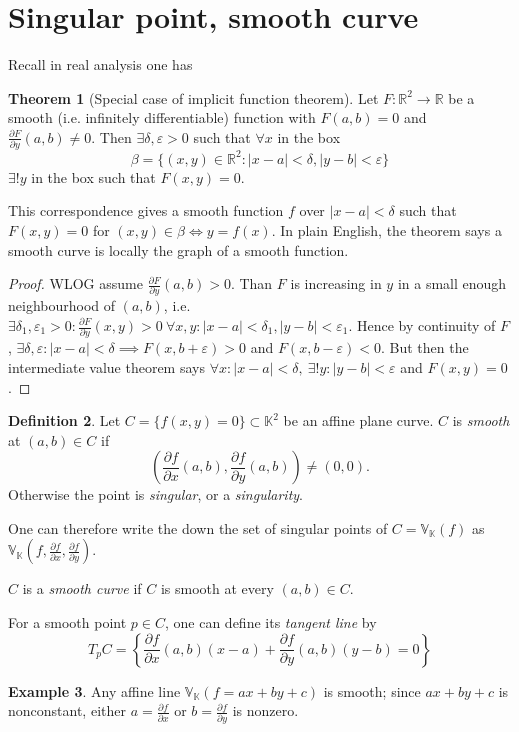 \documentclass{article}
\newcommand{\R}{\mathbb{R}}
\newcommand{\K}{\mathbb{K}}
\newcommand{\V}{\mathbb{V}}
\theoremstyle{definition}
\newtheorem{defn}{Definition}[subsection]
\newtheorem{thm}[defn]{Theorem}
\newtheorem{example}[defn]{Example}
\begin{document}
\section{Singular point, smooth curve}
Recall in real analysis one has
\begin{thm}[Special case of implicit function theorem]
Let $F:\R^2\rightarrow\R$ be a smooth (i.e. infinitely differentiable) function with $F(a,b)=0$ and $\frac{\partial F}{\partial y}(a,b)\neq 0$. Then $\exists \delta,\varepsilon>0$ such that $\forall x$ in the box
\[
\beta=\{(x,y)\in\R^2:|x-a|<\delta,|y-b|<\varepsilon\}
\]
$\exists! y$ in the box such that $F(x,y)=0$.

This correspondence gives a smooth function $f$ over $|x-a|<\delta$ such that $F(x,y)=0$ for $(x,y)\in\beta\iff y=f(x)$. In plain English, the theorem says a smooth curve is locally the graph of a smooth function.
\end{thm}
\begin{proof}
WLOG assume $\frac{\partial F}{\partial y}(a,b)>0$. Than $F$ is increasing in $y$ in a small enough neighbourhood of $(a,b)$, i.e. $\exists\delta_1,\varepsilon_1>0:\frac{\partial F}{\partial y}(x,y)>0 \ \forall x,y:|x-a|<\delta_1,|y-b|<\varepsilon_1$. Hence by continuity of $F$, $\exists\delta,\varepsilon:|x-a|<\delta\implies F(x,b+\varepsilon)>0$ and $F(x,b-\varepsilon)<0$. But then the intermediate value theorem says $\forall x:|x-a|<\delta,\ \exists!y:|y-b|<\varepsilon$ and $F(x,y)=0$.
\end{proof}

\begin{defn}
Let $C=\{f(x,y)=0\}\subset\K^2$ be an affine plane curve. $C$ is \textit{smooth} at $(a,b)\in C$ if
\[
\left(\frac{\partial f}{\partial x}(a,b),\frac{\partial f}{\partial y}(a,b)\right)\neq (0,0).
\]
Otherwise the point is \textit{singular}, or a \textit{singularity}.

One can therefore write the down the set of singular points of $C=\V_\K(f)$ as $\V_\K\left(f,\frac{\partial f}{\partial x},\frac{\partial f}{\partial y}\right)$.

$C$ is a \textit{smooth curve} if $C$ is smooth at every $(a,b)\in C$.

For a smooth point $p\in C$, one can define its \textit{tangent line} by
\[
T_pC=\left\{\frac{\partial f}{\partial x}(a,b)(x-a)+\frac{\partial f}{\partial y}(a,b)(y-b)=0\right\}
\]
\end{defn}
\begin{example}
Any affine line $\V_\K(f=ax+by+c)$ is smooth; since $ax+by+c$ is nonconstant, either $a=\frac{\partial f}{\partial x}$ or $b=\frac{\partial f}{\partial y}$ is nonzero.
\end{example}
\end{document}
